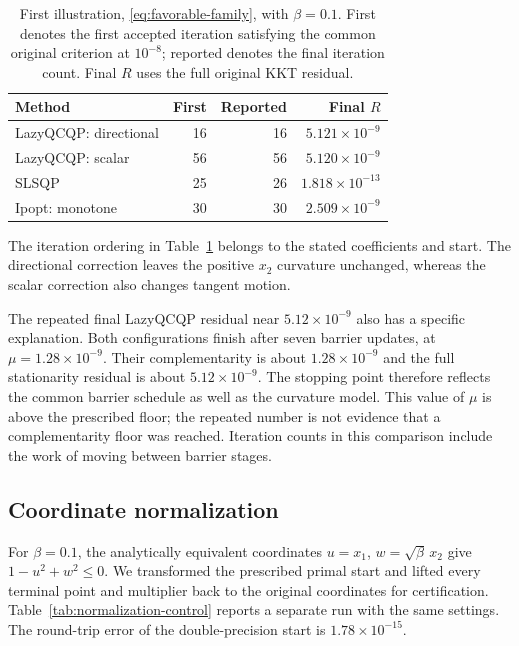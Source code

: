 \documentclass[pdflatex,sn-mathphys-num]{sn-jnl}
\theoremstyle{thmstyleone}
\theoremstyle{thmstylethree}
\begin{document}
\begin{table}[tb]
\centering\small
\caption{First illustration, \eqref{eq:favorable-family}, with $\beta=0.1$. First denotes the first accepted
iteration satisfying the common original criterion at $10^{-8}$;
reported denotes the final iteration count. Final $R$ uses the full
original KKT residual.}
\label{tab:favorable-comparison}

\begin{tabular}{lrrr}
\toprule
Method & First & Reported & Final $R$ \\
\midrule
LazyQCQP: directional & 16 & 16 & $5.121\times10^{-9}$ \\
LazyQCQP: scalar & 56 & 56 & $5.120\times10^{-9}$ \\
SLSQP & 25 & 26 & $1.818\times10^{-13}$ \\
Ipopt: monotone & 30 & 30 & $2.509\times10^{-9}$ \\
\bottomrule
\end{tabular}


\end{table}

The iteration ordering in Table~\ref{tab:favorable-comparison} belongs
to the stated coefficients and start. The directional correction leaves
the positive $x_2$ curvature unchanged, whereas the scalar correction
also changes tangent motion. 

The repeated final LazyQCQP residual near $5.12\times10^{-9}$ also has
a specific explanation. Both configurations finish after seven barrier
updates, at $\mu=1.28\times10^{-9}$. Their complementarity is about
$1.28\times10^{-9}$ and the full stationarity residual is about
$5.12\times10^{-9}$. The stopping point therefore reflects the common
barrier schedule as well as the curvature model. This value of $\mu$
is above the prescribed floor; the repeated number is not evidence
that a complementarity floor was reached. Iteration counts in this
comparison include the work of moving between barrier stages.

\subsection{Coordinate normalization}

For $\beta=0.1$, the analytically equivalent coordinates
$u=x_1$, $w=\sqrt\beta\,x_2$ give
$1-u^2+w^2\leq0$. We transformed the prescribed primal start
and lifted every terminal point and multiplier back to the original
coordinates for certification. Table~\ref{tab:normalization-control}
reports a separate run with the same settings. The round-trip error of
the double-precision start is $1.78\times10^{-15}$.
\end{document}
